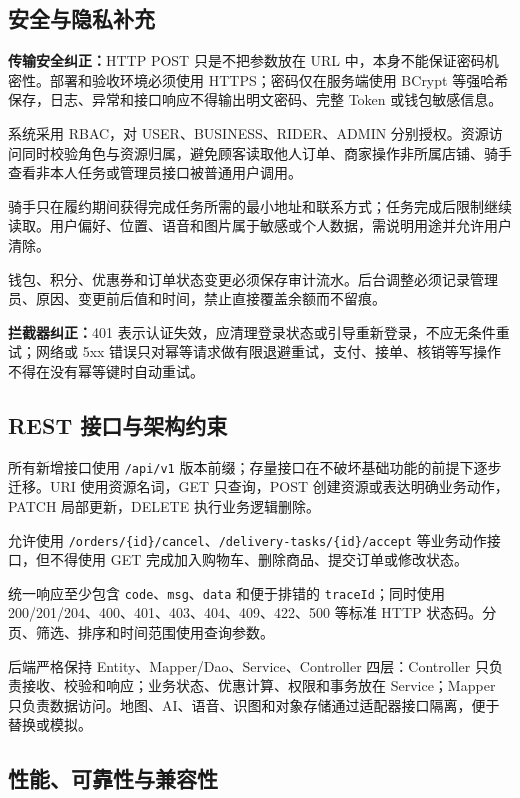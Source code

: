 \begingroup
\color{red}

\subsection{安全与隐私补充}

\textbf{传输安全纠正：}HTTP POST 只是不把参数放在 URL 中，本身不能保证密码机密性。部署和验收环境必须使用 HTTPS；密码仅在服务端使用 BCrypt 等强哈希保存，日志、异常和接口响应不得输出明文密码、完整 Token 或钱包敏感信息。

系统采用 RBAC，对 USER、BUSINESS、RIDER、ADMIN 分别授权。资源访问同时校验角色与资源归属，避免顾客读取他人订单、商家操作非所属店铺、骑手查看非本人任务或管理员接口被普通用户调用。

骑手只在履约期间获得完成任务所需的最小地址和联系方式；任务完成后限制继续读取。用户偏好、位置、语音和图片属于敏感或个人数据，需说明用途并允许用户清除。

钱包、积分、优惠券和订单状态变更必须保存审计流水。后台调整必须记录管理员、原因、变更前后值和时间，禁止直接覆盖余额而不留痕。

\textbf{拦截器纠正：}401 表示认证失效，应清理登录状态或引导重新登录，不应无条件重试；网络或 5xx 错误只对幂等请求做有限退避重试，支付、接单、核销等写操作不得在没有幂等键时自动重试。

\subsection{REST 接口与架构约束}

所有新增接口使用 \texttt{/api/v1} 版本前缀；存量接口在不破坏基础功能的前提下逐步迁移。URI 使用资源名词，GET 只查询，POST 创建资源或表达明确业务动作，PATCH 局部更新，DELETE 执行业务逻辑删除。

允许使用 \texttt{/orders/\{id\}/cancel}、\texttt{/delivery-tasks/\{id\}/accept} 等业务动作接口，但不得使用 GET 完成加入购物车、删除商品、提交订单或修改状态。

统一响应至少包含 \texttt{code}、\texttt{msg}、\texttt{data} 和便于排错的 \texttt{traceId}；同时使用 200/201/204、400、401、403、404、409、422、500 等标准 HTTP 状态码。分页、筛选、排序和时间范围使用查询参数。

后端严格保持 Entity、Mapper/Dao、Service、Controller 四层：Controller 只负责接收、校验和响应；业务状态、优惠计算、权限和事务放在 Service；Mapper 只负责数据访问。地图、AI、语音、识图和对象存储通过适配器接口隔离，便于替换或模拟。

\subsection{性能、可靠性与兼容性}

